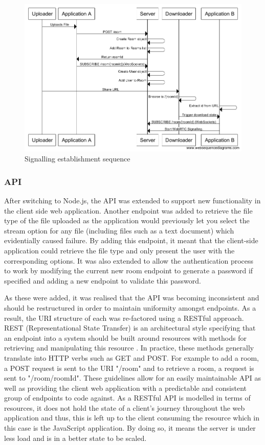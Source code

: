 \documentclass[]{report}
\begin{document}
				\begin{figure}[H]
					\caption{Signalling establishment sequence}
					\centering
					\includegraphics[scale=0.5]{signalling-establishment-sequence.png}
				\end{figure}
				
				\subsubsection*{API}
				After switching to Node.js, the API was extended to support new functionality in the client side web application. Another endpoint was added to retrieve the file type of the file uploaded as the application would previously let you select the stream option for any file (including files such as a text document) which evidentially caused failure. By adding this endpoint, it meant that the client-side application could retrieve the file type and only present the user with the corresponding options. It was also extended to allow the authentication process to work by modifying the current new room endpoint to generate a password if specified and adding a new endpoint to validate this password. 
				
				As these were added, it was realised that the API was becoming inconsistent and should be restructured in order to maintain uniformity amongst endpoints. As a result, the URI structure of each was re-factored using a RESTful approach. REST (Representational State Transfer) is an architectural style specifying that an endpoint into a system should be built around resources with methods for retrieving and manipulating this resource . In practice, these methods generally translate into HTTP verbs such as GET and POST. For example to add a room, a POST request is sent to the URI "/room" and to retrieve a room, a request is sent to "/room/{roomId}". These guidelines allow for an easily maintainable API as well as providing the client web application with a predictable and consistent group of endpoints to code against. As a RESTful API is modelled in terms of resources, it does not hold the state of a client's journey throughout the web application and thus, this is left up to the client consuming the resource which in this case is the JavaScript application. By doing so, it means the server is under less load and is in a better state to be scaled.
				
\end{document}
